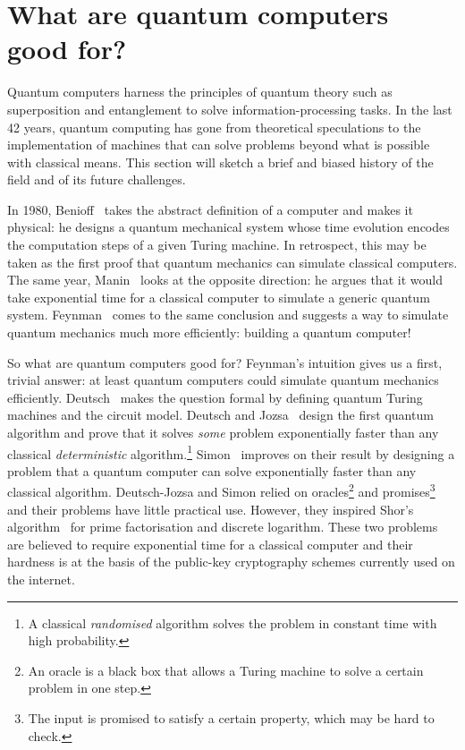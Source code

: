 
\section*{What are quantum computers good for?}


Quantum computers harness the principles of quantum theory such as superposition and entanglement to solve information-processing tasks.
In the last 42 years, quantum computing has gone from theoretical speculations to the implementation of machines that can solve problems beyond what is possible with classical means.
This section will sketch a brief and biased history of the field and of its future challenges.

In 1980, Benioff~\cite{Benioff80} takes the abstract definition of a computer and makes it physical: he designs a quantum mechanical system whose time evolution encodes the computation steps of a given Turing machine.
In retrospect, this may be taken as the first proof that quantum mechanics can simulate classical computers.
The same year, Manin~\cite{Manin80} looks at the opposite direction: he argues that it would take exponential time for a classical computer to simulate a generic quantum system.
Feynman~\cite{Feynman82,Feynman85} comes to the same conclusion and suggests a way to simulate quantum mechanics much more efficiently: building a quantum computer!

So what are quantum computers good for? Feynman's intuition gives us a first, trivial answer: at least quantum computers could simulate quantum mechanics efficiently. Deutsch~\cite{Deutsch85a} makes the question formal by defining quantum Turing machines and the circuit model.
Deutsch and Jozsa~\cite{DeutschJozsa92} design the first quantum algorithm and prove that it solves \emph{some} problem exponentially faster than any classical \emph{deterministic} algorithm.\footnote
{A classical \emph{randomised} algorithm solves the problem in constant time with high probability.}
Simon~\cite{Simon94} improves on their result by designing a problem that a quantum computer can solve exponentially faster than any classical algorithm.
Deutsch-Jozsa and Simon relied on oracles\footnote{An oracle is a black box that allows a Turing machine to solve a certain problem in one step.}
and promises\footnote{The input is promised to satisfy a certain property, which may be hard to check.} and their problems have little practical use.
However, they inspired Shor's algorithm~\cite{Shor94} for prime factorisation and discrete logarithm. These two problems are believed to require exponential time for a classical computer and their hardness is at the basis of the public-key cryptography schemes currently used on the internet.

